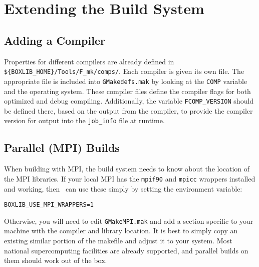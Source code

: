 \section{Extending the Build System}

\subsection{Adding a Compiler}

Properties for different compilers are already defined in {\tt
  \$\{BOXLIB\_HOME\}/Tools/F\_mk/comps/}.  Each compiler is given its
own file.  The appropriate file is included into {\tt GMakedefs.mak}
by looking at the {\tt COMP} variable and the operating system.  These
compiler files define the compiler flags for both optimized and debug
compiling.  Additionally, the variable {\tt FCOMP\_VERSION} should be
defined there, based on the output from the compiler, to provide the
compiler version for output into the {\tt job\_info} file at runtime.


\subsection{Parallel (MPI) Builds}

When building with MPI, the build system needs to know about the location of the
MPI libraries.  If your local MPI has the {\tt mpif90} and {\tt mpicc} wrappers
installed and working, then \maestro\ can use these simply by setting the
environment variable:
\begin{verbatim}
BOXLIB_USE_MPI_WRAPPERS=1
\end{verbatim}
Otherwise, you will need to edit {\tt GMakeMPI.mak} and add a section
specific to your machine with the compiler and library location.  It
is best to simply copy an existing similar portion of the makefile and
adjust it to your system.  Most national supercomputing facilities are
already supported, and parallel builds on them should work out of the
box.



